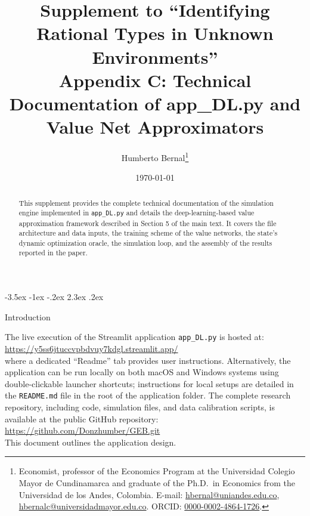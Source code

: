 \documentclass[12pt]{article}
\makeatletter
\newcommand{\pyfile}[1]{\texttt{#1}}
\numberwithin{equation}{section}
\numberwithin{table}{section}
\renewcommand\section{\@startsection {section}{1}{\z@}%
                                   {-3.5ex \@plus -1ex \@minus -.2ex}%
                                   {2.3ex \@plus.2ex}%
                                   {\normalfont\Large\bfseries\raggedright}}
\makeatother
\begin{document}
\title{Supplement to ``Identifying Rational Types in Unknown Environments''\\
Appendix C: Technical Documentation of app\_DL.py and Value Net Approximators}
\author{Humberto Bernal\thanks{Economist, professor of the Economics Program at the Universidad Colegio Mayor de Cundinamarca and graduate of the Ph.D.\ in Economics from the Universidad de los Andes, Colombia. E-mail: \href{mailto:hbernal@uniandes.edu.co}{hbernal@uniandes.edu.co}, \href{mailto:hbernalc@universidadmayor.edu.co}{hbernalc@universidadmayor.edu.co}. ORCID: \href{https://orcid.org/0000-0002-4864-1726}{0000-0002-4864-1726}.}}
\date{\today}
\maketitle

\begin{abstract}
\singlespacing
This supplement provides the complete technical documentation of the simulation engine implemented in \pyfile{app\_DL.py} and details the deep-learning-based value approximation framework described in Section 5 of the main text. It covers the file architecture and data inputs, the training scheme of the value networks, the state's dynamic optimization oracle, the simulation loop, and the assembly of the results reported in the paper.
\end{abstract}

\section{Introduction}

The live execution of the Streamlit application \pyfile{app\_DL.py} is hosted at:\\
\url{https://y5ss6jtuccvpbdvuy7kdgl.streamlit.app/}\\
where a dedicated ``Readme'' tab provides user instructions. Alternatively, the application can be run locally on both macOS and Windows systems using double-clickable launcher shortcuts; instructions for local setups are detailed in the \texttt{README.md} file in the root of the application folder. The complete research repository, including code, simulation files, and data calibration scripts, is available at the public GitHub repository:\\
\url{https://github.com/Donzhumber/GEB.git}\\
This document outlines the application design.
\end{document}
